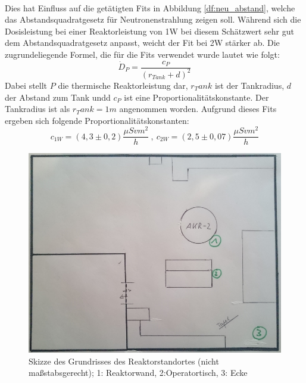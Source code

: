          \label{dft:dosi}
         \ \\
    Dies hat Einfluss auf die getätigten Fits in Abbildung \ref{df:neu_abstand}, welche das Abstandsquadratgesetz für Neutronenstrahlung zeigen soll. Während sich die Dosisleistung bei einer Reaktorleistung von 1\unit{W} bei diesem Schätzwert sehr gut dem Abstandsquadratgesetz anpasst, weicht der Fit bei 2\unit{W} stärker ab. 
    Die zugrundeliegende Formel, die für die Fits verwendet wurde lautet wie folgt:
    \begin{equation*}
        \dot D_P = \frac{c_P}{\left(r_{Tank} + d\right)^2}
    \end{equation*}
    Dabei stellt $P$ die thermische Reaktorleistung dar, $r_Tank$ ist der Tankradius, $d$ der Abstand zum Tank undd $c_P$ ist eine Proportionalitätskonstante. Der Tankradius ist als $r_Tank = 1\unit{m}$ angenommen worden.
    Aufgrund dieses Fits ergeben sich folgende Proportionalitätskonstanten:
    $$ c_{1W} = (4,3 \pm 0,2)\unit{\frac{\mu Sv m^2}{h}} \ , \ c_{2W} = (2,5 \pm 0,07)\unit{\frac{\mu Sv m^2}{h}} $$
    \begin{figure}
        \centering
        \includegraphics[scale=0.4]{pic/skizze_grundriss}
        \caption{Skizze des Grundrisses des Reaktorstandortes (nicht maßstabsgerecht); 1: Reaktorwand, 2:Operatortisch, 3: Ecke}
        \label{skizze}
    \end{figure}

